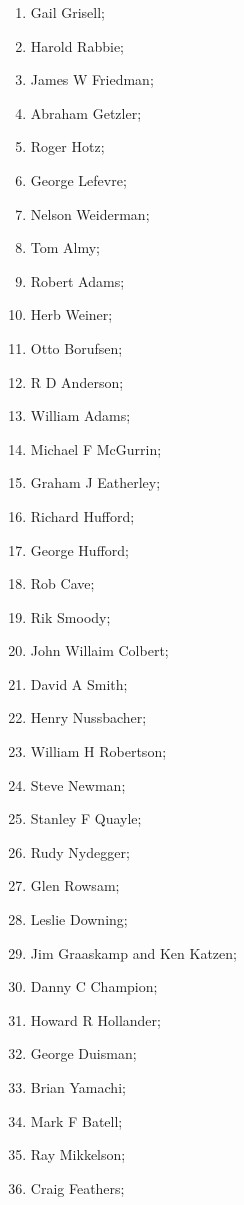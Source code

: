 \documentclass{article}
\begin{document}
\begin{multicols}{3}
    \begin{enumerate}
        \item Gail Grisell;
        \item Harold Rabbie;
        \item James W Friedman;
        \item Abraham Getzler;
        \item Roger Hotz;
        \item George Lefevre;
        \item Nelson Weiderman;
        \item Tom Almy;
        \item Robert Adams;
        \item Herb Weiner;
        \item Otto Borufsen;
        \item R D Anderson;
        \item William Adams;
        \item Michael F McGurrin;
        \item Graham J Eatherley;
        \item Richard Hufford;
        \item George Hufford;
        \item Rob Cave;
        \item Rik Smoody;
        \item John Willaim Colbert;
        \item David A Smith;
        \item Henry Nussbacher;
        \item William H Robertson;
        \item Steve Newman;
        \item Stanley F Quayle;
        \item Rudy Nydegger;
        \item Glen Rowsam;
        \item Leslie Downing;
        \item Jim Graaskamp and Ken Katzen;
        \item Danny C Champion;
        \item Howard R Hollander;
        \item George Duisman;
        \item Brian Yamachi;
        \item Mark F Batell;
        \item Ray Mikkelson;
        \item Craig Feathers;

\end{enumerate}
\end{multicols}
\end{document}

